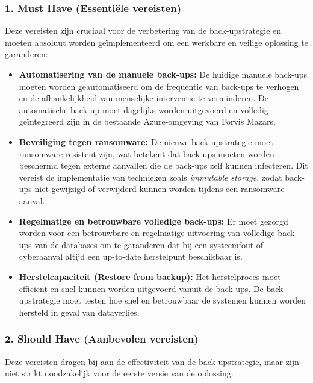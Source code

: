 \subsubsection{1. Must Have (Essentiële vereisten)}
Deze vereisten zijn cruciaal voor de verbetering van de back-upstrategie en moeten absoluut worden geïmplementeerd om een werkbare en veilige oplossing te garanderen:

\begin{itemize}
    \item \textbf{Automatisering van de manuele back-ups:} De huidige manuele back-ups moeten worden geautomatiseerd om de frequentie van back-ups te verhogen en de afhankelijkheid van menselijke interventie te verminderen. De automatische back-up moet dagelijks worden uitgevoerd en volledig geïntegreerd zijn in de bestaande Azure-omgeving van Forvis Mazars.
    
    \item \textbf{Beveiliging tegen ransomware:} De nieuwe back-upstrategie moet ransomware-resistent zijn, wat betekent dat back-ups moeten worden beschermd tegen externe aanvallen die de back-ups zelf kunnen infecteren. Dit vereist de implementatie van technieken zoals \textit{immutable storage}, zodat back-ups niet gewijzigd of verwijderd kunnen worden tijdens een ransomware-aanval.
    
    \item \textbf{Regelmatige en betrouwbare volledige back-ups:} Er moet gezorgd worden voor een betrouwbare en regelmatige uitvoering van volledige back-ups van de databases om te garanderen dat bij een systeemfout of cyberaanval altijd een up-to-date herstelpunt beschikbaar is.
    
    \item \textbf{Herstelcapaciteit (Restore from backup):} Het herstelproces moet efficiënt en snel kunnen worden uitgevoerd vanuit de back-ups. De back-upstrategie moet testen hoe snel en betrouwbaar de systemen kunnen worden hersteld in geval van dataverlies.
\end{itemize}

\subsubsection{2. Should Have (Aanbevolen vereisten)}
Deze vereisten dragen bij aan de effectiviteit van de back-upstrategie, maar zijn niet strikt noodzakelijk voor de eerste versie van de oplossing:

